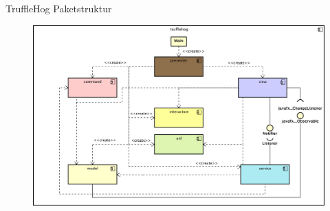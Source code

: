 \begin{frame}{TruffleHog Paketstruktur}
  \begin{figure}
    \centering
    \includegraphics[width=\textwidth]{./images/trufflehog-component.png}
  \end{figure}
\end{frame}
